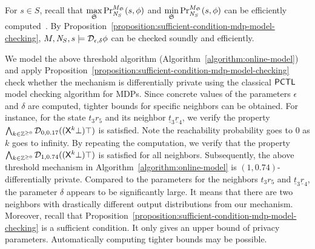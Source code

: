 For $s \in S$, recall that $\max\limits_{\scheduler{S}}
\myPr{s}{M_{\scheduler{S}}}{\neighbor{S}}{\phi}$ and
$\min\limits_{\scheduler{S}}
\myPr{s}{M_{\scheduler{S}}}{\neighbor{S}}{\phi}$ can be efficiently 
computed~\cite{BK:08:PMC}. 
By
Proposition~\ref{proposition:sufficient-condition-mdp-model-checking},
$M, \neighbor{S}, s \models \dpriv{\epsilon}{\delta} \phi$ can be
checked soundly and efficiently.

We model the above threshold algorithm (Algorithm~\ref{algorithm:online-model})
and apply
Proposition~\ref{proposition:sufficient-condition-mdp-model-checking} 
check whether the mechanism is differentially private using the
classical $\PCTL$ model checking algorithm for MDPs. 
Since concrete values of the parameters $\epsilon$ and $\delta$ are
computed, tighter bounds for specific neighbors can be obtained.
For instance, for the state $t_3r_5$ and its neighbor
$\underline{t}_3\underline{r}_4$, we verify the property $\bigwedge_{k
  \in \bbfZ^{\geq 0}} \dpriv{0}{0.17} ((\X^k\bot) \top)$ is
satisfied. Note the reachability probability goes to $0$ as $k$ goes
to infinity. By repeating the computation, we verify that 
the property $\bigwedge_{k \in \bbfZ^{\geq 0}} \dpriv{1}{0.74}
((\X^k\bot) \top)$ is satisfied for all neighbors. 
Subsequently, the above threshold mechanism in
Algorithm~\ref{algorithm:online-model} is $(1, 0.74)$-differentially
private. Compared to the parameters for the neighbors $t_3r_5$ and
$\underline{t}_3\underline{r}_4$, the parameter $\delta$ appears to be
significantly large. It means that there are two neighbors with
drastically different output distributions from our mechanism.
Moreover, recall that
Proposition~\ref{proposition:sufficient-condition-mdp-model-checking}
is a sufficient condition. It only gives an upper bound of privacy
parameters. Automatically computing tighter bounds may be possible. 

